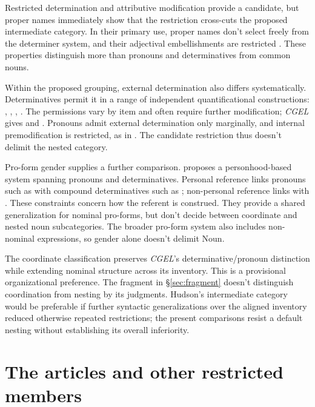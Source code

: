 \documentclass[12pt]{article}
\begin{document}
Restricted determination and attributive modification provide a candidate, but proper names immediately show that the restriction cross-cuts the proposed intermediate category. In their primary use, proper names don't select freely from the determiner system, and their adjectival embellishments are restricted \citep[517, 519--520]{huddleston2002}. These properties distinguish more than pronouns and determinatives from common nouns.

Within the proposed grouping, external determination also differs systematically. Determinatives permit it in a range of independent quantificational constructions: , , , . The permissions vary by item and often require further modification; \textit{CGEL} gives  and  \citep[415--416]{huddleston2002}. Pronouns admit external determination only marginally, and internal premodification is restricted, as in  \citep[429--430]{huddleston2002}. The candidate restriction thus doesn't delimit the nested category.

Pro-form gender supplies a further comparison. \textcite{reynolds2025proformgender} proposes a personhood-based system spanning pronouns and determinatives. Personal reference links pronouns such as  with compound determinatives such as ; non-personal reference links  with . These constraints concern how the referent is construed. They provide a shared generalization for nominal pro-forms, but don't decide between coordinate and nested noun subcategories. The broader pro-form system also includes non-nominal expressions, so gender alone doesn't delimit Noun.

The coordinate classification preserves \textit{CGEL}'s determinative/pronoun distinction while extending nominal structure across its inventory. This is a provisional organizational preference. The fragment in §\ref{sec:fragment} doesn't distinguish coordination from nesting by its judgments. Hudson's intermediate category would be preferable if further syntactic generalizations over the aligned inventory reduced otherwise repeated restrictions; the present comparisons resist a default nesting without establishing its overall inferiority.

\section{The articles and other restricted members}\label{sec:articles}
\end{document}
